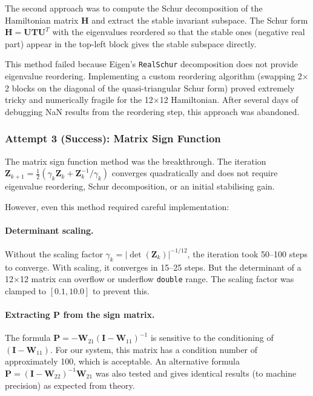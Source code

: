 \documentclass[12pt, a4paper]{article}
\newcommand{\bP}{\bm{P}}
\newcommand{\bI}{\bm{I}}
\begin{document}
The second approach was to compute the Schur decomposition of the Hamiltonian matrix $\bm{H}$ and extract the stable invariant subspace.  The Schur form $\bm{H} = \bm{U} \bm{T} \bm{U}^T$ with the eigenvalues reordered so that the stable ones (negative real part) appear in the top-left block gives the stable subspace directly.

This method failed because Eigen's \texttt{RealSchur} decomposition does not provide eigenvalue reordering.  Implementing a custom reordering algorithm (swapping 2$\times$2 blocks on the diagonal of the quasi-triangular Schur form) proved extremely tricky and numerically fragile for the 12$\times$12 Hamiltonian.  After several days of debugging NaN results from the reordering step, this approach was abandoned.

\subsubsection{Attempt 3 (Success): Matrix Sign Function}

The matrix sign function method was the breakthrough.  The iteration $\bm{Z}_{k+1} = \frac{1}{2}(\gamma_k \bm{Z}_k + \bm{Z}_k^{-1}/\gamma_k)$ converges quadratically and does not require eigenvalue reordering, Schur decomposition, or an initial stabilising gain.

However, even this method required careful implementation:

\paragraph{Determinant scaling.}  Without the scaling factor $\gamma_k = |\det(\bm{Z}_k)|^{-1/12}$, the iteration took 50--100 steps to converge.  With scaling, it converges in 15--25 steps.  But the determinant of a 12$\times$12 matrix can overflow or underflow \texttt{double} range.  The scaling factor was clamped to $[0.1, 10.0]$ to prevent this.

\paragraph{Extracting P from the sign matrix.}  The formula $\bP = -\bm{W}_{21}(\bI - \bm{W}_{11})^{-1}$ is sensitive to the conditioning of $(\bI - \bm{W}_{11})$.  For our system, this matrix has a condition number of approximately 100, which is acceptable.  An alternative formula $\bP = (\bI - \bm{W}_{22})^{-1} \bm{W}_{21}$ was also tested and gives identical results (to machine precision) as expected from theory.
\end{document}
